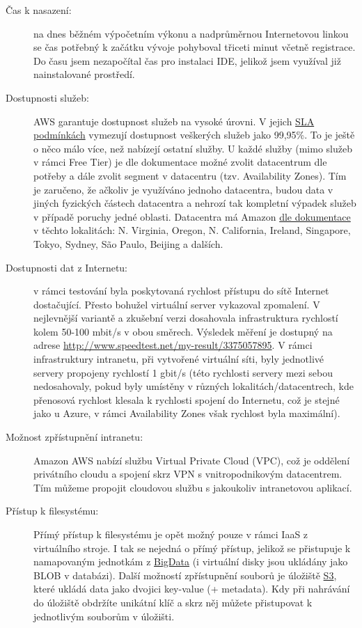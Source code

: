 \begin{description}
	\item [Čas k nasazení:] na dnes běžném výpočetním výkonu a nadprůměrnou Internetovou linkou se čas potřebný k začátku vývoje pohyboval třiceti minut včetně registrace. Do času jsem nezapočítal čas pro instalaci IDE, jelikož jsem využíval již nainstalované prostředí.
	\item [Dostupnosti služeb:] AWS garantuje dostupnost služeb na vysoké úrovni. V jejich \href{http://aws.amazon.com/ec2/sla/}{SLA podmínkách\cite{amazon:sla}} vymezují dostupnost veškerých služeb jako 99,95\%. To je ještě o něco málo více, než nabízejí ostatní služby. U každé služby (mimo služeb v rámci Free Tier) je dle dokumentace možné zvolit datacentrum dle potřeby a dále zvolit segment v datacentru (tzv. Availability Zones). Tím je zaručeno, že ačkoliv je využíváno jednoho datacentra, budou data v jiných fyzických částech datacentra a nehrozí tak kompletní výpadek služeb v případě poruchy jedné oblasti. Datacentra má Amazon \href{http://aws.amazon.com/about-aws/globalinfrastructure/regional-product-services/}{dle dokumentace\cite{amazon:locations}} v těchto lokalitách: N. Virginia, Oregon, N. California, Ireland, Singapore, Tokyo, Sydney, São Paulo, Beijing a dalších.
	\item [Dostupnosti dat z Internetu:] v rámci testování byla poskytovaná rychlost přístupu do sítě Internet dostačující. Přesto bohužel virtuální server vykazoval zpomalení. V nejlevnější variantě a zkušební verzi dosahovala infrastruktura rychlostí kolem 50-100 mbit/s v obou směrech. Výsledek měření je dostupný na adrese \href{http://www.speedtest.net/my-result/3375057895}{http://www.speedtest.net/my-result/3375057895}. V rámci infrastruktury intranetu, při vytvořené virtuální síti, byly jednotlivé servery propojeny rychlostí 1 gbit/s (této rychlosti servery mezi sebou nedosahovaly, pokud byly umístěny v různých lokalitách/datacentrech, kde přenosová rychlost klesala k rychlosti spojení do Internetu, což je stejné jako u Azure, v rámci Availability Zones však rychlost byla maximální).
	\item [Možnost zpřístupnění intranetu:] Amazon AWS nabízí službu Virtual Private Cloud (VPC), což je oddělení privátního cloudu a spojení skrz VPN s vnitropodnikovým datacentrem. Tím můžeme propojit cloudovou službu s jakoukoliv intranetovou aplikací.
	\item [Přístup k filesystému:] Přímý přístup k filesystému je opět možný pouze v rámci IaaS z virtuálního stroje. I tak se nejedná o přímý přístup, jelikož se přistupuje k namapovaným jednotkám z \href{http://aws.amazon.com/big-data/}{BigData} (i virtuální disky jsou ukládány jako BLOB v databázi). Další možností zpřístupnění souborů je úložiště \href{http://aws.amazon.com/s3/}{S3}, které ukládá data jako dvojici key-value (+ metadata). Kdy při nahrávání do úložiště obdržíte unikátní klíč a skrz něj můžete přistupovat k jednotlivým souborům v úložišti.

\end{description}
